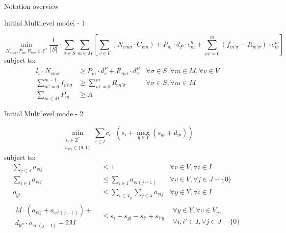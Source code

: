 \documentclass{beamer}
\begin{document}
\begin{frame}{Notation overview}
\end{frame}


\begin{frame}{Initial Multilevel model - 1}
\scriptsize

\begin{equation}
	\min_{N_{vm\sigma}, P_m, R_{m\sigma} \in \mathbb{Z}^*} 
	\frac{1}{|S|} \cdot \sum_{\sigma \in S} \sum_{m \in M} [\sum_{v \in V} 
	(N_{vm\sigma} \cdot C_{vm}) +  
	P_m \cdot d_P \cdot e^h_m + 
	\sum_{m' = 0}^{m} (f_{m'\sigma} - R_{m'\sigma}) \cdot e^m_m]	
\end{equation}
subject to:
\begin{align}
l_v \cdot N_{vm\sigma} 			&\geq 	P_m \cdot d^P_v + R_{m\sigma} \cdot d^R_v		& \forall \sigma \in S, \forall m \in M, \forall v \in V 		\\
\sum_{m' = 0}^{m-1} f_{m'\sigma}	&\geq 	\sum_{m' = 0}^m R_{m'\sigma}				& \forall \sigma \in S, \forall m \in M				\\
\sum_{m\in M} P_m 			&\geq 	A 								&						
\end{align}

\end{frame}

\begin{frame}{Initial Multilevel mode - 2}
\scriptsize

\begin{equation}
	\min_{\substack{s_i \in \mathbb{Z}^* \\ 
	a_{vij} \in \{0, 1\}}} 
	\sum_{i \in I} c_i \cdot (s_i + \max_{y \in Y} (s_{yi}+ d_{yi}))
\end{equation}
subject to:
\begin{align}
\sum_{j \in J} a_{vij}						&\leq 		1						& \forall v \in V, \forall i \in I 						\\
\sum_{i \in I} a_{vij}						&\leq 		\sum_{i \in I} a_{vi(j-1)}			& \forall v \in V, \forall j \in J - \{ 0 \}					\\
\rho_{yi}								&\leq	 	\sum_{v \in V_y} \sum_{j \in J} a_{vij} 	& \forall y \in Y, \forall i \in I						\\	
\begin{aligned} M \cdot (a_{vij} + a_{vi'(j-1)}) + \\ 
d_{yi'} \cdot a_{vi'(j-1)} - 2M \end{aligned}			&\leq	 	s_i + s_{yi} - s_{i'} + s_{i'y}		& \begin{aligned} \forall y \in Y, \forall v \in V_y, 			\\
																		\forall i, i' \in I, \forall j \in J - \{ 0 \}	\end{aligned}		
\end{align}

\end{frame}
\end{document}
